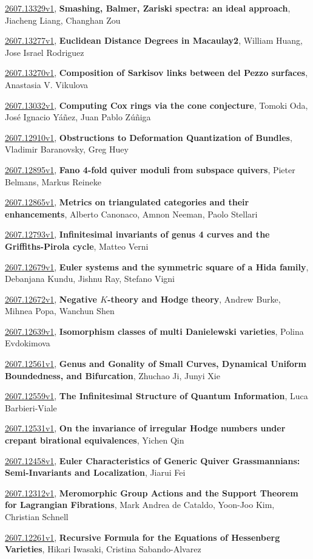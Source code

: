\documentclass[9pt, a4paper]{article}
\theoremstyle{plain}
\theoremstyle{definition}
\theoremstyle{remark}
\newcommand{\arxiv}[3]{\href{https://arxiv.org/abs/#1}{#1}, \textbf{\textcolor{arxivblue}{#2}}, #3}
\begin{document}
\arxiv{2607.13329v1}{Smashing, Balmer, Zariski spectra: an ideal approach}{Jiacheng Liang, Changhan Zou}

\arxiv{2607.13277v1}{Euclidean Distance Degrees in Macaulay2}{William Huang, Jose Israel Rodriguez}

\arxiv{2607.13270v1}{Composition of Sarkisov links between del Pezzo surfaces}{Anastasia V. Vikulova}

\arxiv{2607.13032v1}{Computing Cox rings via the cone conjecture}{Tomoki Oda, José Ignacio Yáñez, Juan Pablo Zúñiga}

\arxiv{2607.12910v1}{Obstructions to Deformation Quantization of Bundles}{Vladimir Baranovsky, Greg Huey}

\arxiv{2607.12895v1}{Fano 4-fold quiver moduli from subspace quivers}{Pieter Belmans, Markus Reineke}

\arxiv{2607.12865v1}{Metrics on triangulated categories and their enhancements}{Alberto Canonaco, Amnon Neeman, Paolo Stellari}

\arxiv{2607.12793v1}{Infinitesimal invariants of genus 4 curves and the Griffiths-Pirola cycle}{Matteo Verni}

\arxiv{2607.12679v1}{Euler systems and the symmetric square of a Hida family}{Debanjana Kundu, Jishnu Ray, Stefano Vigni}

\arxiv{2607.12672v1}{Negative $K$-theory and Hodge theory}{Andrew Burke, Mihnea Popa, Wanchun Shen}

\arxiv{2607.12639v1}{Isomorphism classes of multi Danielewski varieties}{Polina Evdokimova}

\arxiv{2607.12561v1}{Genus and Gonality of Small Curves, Dynamical Uniform Boundedness, and Bifurcation}{Zhuchao Ji, Junyi Xie}

\arxiv{2607.12559v1}{The Infinitesimal Structure of Quantum Information}{Luca Barbieri-Viale}

\arxiv{2607.12531v1}{On the invariance of irregular Hodge numbers under crepant birational equivalences}{Yichen Qin}

\arxiv{2607.12458v1}{Euler Characteristics of Generic Quiver Grassmannians: Semi-Invariants and Localization}{Jiarui Fei}

\arxiv{2607.12312v1}{Meromorphic Group Actions and the Support Theorem for Lagrangian Fibrations}{Mark Andrea de Cataldo, Yoon-Joo Kim, Christian Schnell}

\arxiv{2607.12261v1}{Recursive Formula for the Equations of Hessenberg Varieties}{Hikari Iwasaki, Cristina Sabando-Alvarez}
\end{document}
